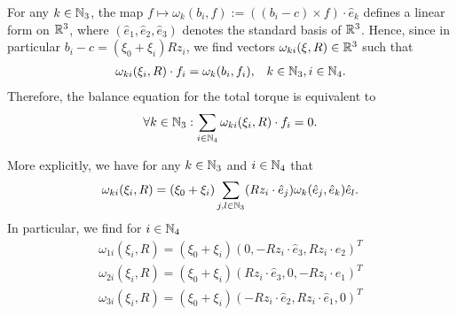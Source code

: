 For any $k \in \mathbb{N}_3$, the map $f \mapsto \omega_k(b_i, f) := ((b_i - c) \times f) \cdot \hat{e}_k$ defines a linear form on $\mathbb{R}^3$, where $(\hat{e}_1, \hat{e}_2, \hat{e}_3)$ denotes the standard basis of $\mathbb{R}^3$. Hence, since in particular $b_i - c = (\xi_0 + \xi_i) R z_i$, we find vectors $\omega_{ki}(\xi, R) \in \mathbb{R}^3$ such that
\begin{eqnarray}
	\omega_{ki}(\xi_i, R) \cdot f_i = \omega_k(b_i, f_i), & & k \in \mathbb{N}_3, i \in \mathbb{N}_4.
\end{eqnarray}
Therefore, the balance equation for the total torque is equivalent to
\begin{eqnarray}
\forall k \in \mathbb{N}_3: \sum_{i \in \mathbb{N}_4} \omega_{ki}(\xi_i, R) \cdot f_i = 0.
\end{eqnarray}

\begin{remark}
More explicitly, we have for any $k \in \mathbb{N}_3$ and $i \in \mathbb{N}_4$ that
\begin{equation}
	\omega_{ki}(\xi_i, R) = (\xi_0 + \xi_i) \sum_{j,l \in \mathbb{N}_3}(R z_i \cdot \hat{e}_j)\omega_{k}(\hat{e}_{j}, \hat{e}_{k})\hat{e}_l.
\end{equation}
In particular, we find for $i \in \mathbb{N}_4$
\begin{equation}
\begin{array}{lr}
	\omega_{1i}(\xi_i, R) = (\xi_0 + \xi_i) \left (
	0 ,
	-R z_i \cdot \hat{e}_3,
	R z_i \cdot \hat{e}_2
	\right )^T\\
	\omega_{2i}(\xi_i, R) = (\xi_0 + \xi_i) \left (
	R z_i \cdot \hat{e}_3 ,
	0,
	- R z_i \cdot \hat{e}_1
	\right )^T\\
	\omega_{3i}(\xi_i, R) = (\xi_0 + \xi_i) \left (
	- R z_i \cdot \hat{e}_2 ,
	R z_i \cdot \hat{e}_1,
	0
	\right )^T
\end{array}
\end{equation}
\end{remark}

